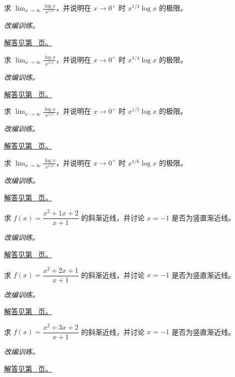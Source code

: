 \documentclass[UTF8,12pt,a4paper,fontset=fandol]{ctexart}
\begin{document}
\begin{example}[对数增长慢于正幂]\label{ex:c4q15}
求 $\displaystyle\lim_{x\to\infty}\frac{\log x}{x^{1/3}}$，并说明在 $x\to0^+$ 时 $x^{1/3}\log x$ 的极限。
\par\textit{改编训练。}\par\hyperref[ans:c4q15]{解答见第~\pageref{ans:c4q15} 页。}
\end{example}
\begin{example}[对数增长慢于正幂]\label{ex:c4q16}
求 $\displaystyle\lim_{x\to\infty}\frac{\log x}{x^{1/4}}$，并说明在 $x\to0^+$ 时 $x^{1/4}\log x$ 的极限。
\par\textit{改编训练。}\par\hyperref[ans:c4q16]{解答见第~\pageref{ans:c4q16} 页。}
\end{example}
\begin{example}[对数增长慢于正幂]\label{ex:c4q17}
求 $\displaystyle\lim_{x\to\infty}\frac{\log x}{x^{1/5}}$，并说明在 $x\to0^+$ 时 $x^{1/5}\log x$ 的极限。
\par\textit{改编训练。}\par\hyperref[ans:c4q17]{解答见第~\pageref{ans:c4q17} 页。}
\end{example}
\begin{example}[对数增长慢于正幂]\label{ex:c4q18}
求 $\displaystyle\lim_{x\to\infty}\frac{\log x}{x^{1/6}}$，并说明在 $x\to0^+$ 时 $x^{1/6}\log x$ 的极限。
\par\textit{改编训练。}\par\hyperref[ans:c4q18]{解答见第~\pageref{ans:c4q18} 页。}
\end{example}
\begin{example}[多项式除法求渐近线]\label{ex:c4q19}
求 $f(x)=\dfrac{x^2+1x+2}{x+1}$ 的斜渐近线，并讨论 $x=-1$ 是否为竖直渐近线。
\par\textit{改编训练。}\par\hyperref[ans:c4q19]{解答见第~\pageref{ans:c4q19} 页。}
\end{example}
\begin{example}[多项式除法求渐近线]\label{ex:c4q20}
求 $f(x)=\dfrac{x^2+2x+1}{x+1}$ 的斜渐近线，并讨论 $x=-1$ 是否为竖直渐近线。
\par\textit{改编训练。}\par\hyperref[ans:c4q20]{解答见第~\pageref{ans:c4q20} 页。}
\end{example}
\begin{example}[多项式除法求渐近线]\label{ex:c4q21}
求 $f(x)=\dfrac{x^2+3x+2}{x+1}$ 的斜渐近线，并讨论 $x=-1$ 是否为竖直渐近线。
\par\textit{改编训练。}\par\hyperref[ans:c4q21]{解答见第~\pageref{ans:c4q21} 页。}
\end{example}
\end{document}
